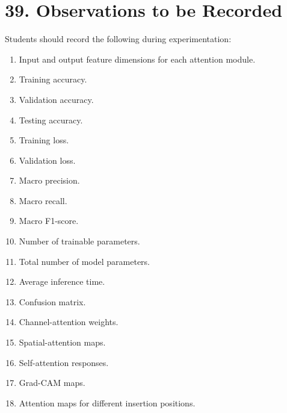 \documentclass[10pt]{article}
\begin{document}
\section*{39. Observations to be Recorded}

Students should record the following during experimentation:

\begin{enumerate}

\item Input and output feature dimensions for each attention module.

\item Training accuracy.

\item Validation accuracy.

\item Testing accuracy.

\item Training loss.

\item Validation loss.

\item Macro precision.

\item Macro recall.

\item Macro F1-score.

\item Number of trainable parameters.

\item Total number of model parameters.

\item Average inference time.

\item Confusion matrix.

\item Channel-attention weights.

\item Spatial-attention maps.

\item Self-attention responses.

\item Grad-CAM maps.

\item Attention maps for different insertion positions.

\end{enumerate}
\end{document}
